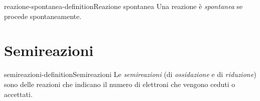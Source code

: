 \documentclass[preview]{standalone}
\begin{document}
\begin{snippetdefinition}{reazione-spontanea-definition}{Reazione spontanea}
    Una reazione è \textit{spontanea} se procede spontaneamente.
\end{snippetdefinition}

\section{Semireazioni}

\begin{snippetdefinition}{semireazioni-definition}{Semireazioni}
    Le \textit{semireazioni} (di \textit{ossidazione} e di \textit{riduzione})
    sono delle reazioni che indicano il numero di elettroni che vengono
    ceduti o accettati.
\end{snippetdefinition}
\end{document}
